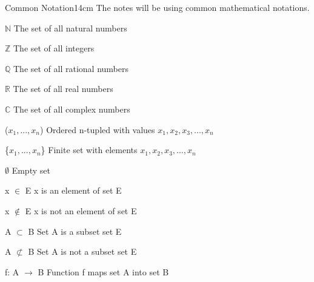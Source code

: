 \newpage

    \begin{definition}{Common Notation}{14cm}
        The notes will be using common mathematical notations.

        \hspace{0.5cm}
        $\mathbb{N}$
        \hspace{3cm}
        The set of all natural numbers

        \hspace{0.5cm}
        $\mathbb{Z}$
        \hspace{3cm}
        The set of all integers

        \hspace{0.5cm}
        $\mathbb{Q}$
        \hspace{3cm}
        The set of all rational numbers

        \hspace{0.5cm}
        $\mathbb{R}$
        \hspace{3cm}
        The set of all real numbers

        \hspace{0.5cm}
        $\mathbb{C}$
        \hspace{3cm}
        The set of all complex numbers

        \hspace{0.5cm}
        ($x_1,...,x_n$)
        \hspace{1.45cm}
        Ordered n-tupled with values $x_1,x_2,x_3,...,x_n$

        \hspace{0.5cm}
        \{$x_1,...,x_n$\}
        \hspace{1.35cm}
        Finite set with elements $x_1,x_2,x_3,...,x_n$

        \hspace{0.5cm}
        $\emptyset$
        \hspace{3.1cm}
        Empty set

        \hspace{0.5cm}
        x $\in$ E
        \hspace{2.3cm}
        x is an element of set E

        \hspace{0.5cm}
        x $\not \in$ E
        \hspace{2.3cm}
        x is not an element of set E

        \hspace{0.5cm}
        A $\subset$ B
        \hspace{2.2cm}
        Set A is a subset set E

        \hspace{0.5cm}
        A $\not \subset$ B
        \hspace{2.2cm}
        Set A is not a subset set E

        \hspace{0.5cm}
        f: A $\rightarrow$ B
        \hspace{1.7cm}
        Function f maps set A into set B
    \end{definition}




